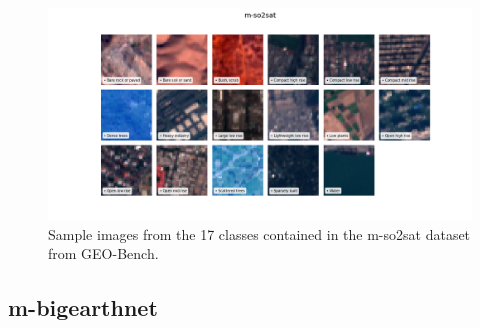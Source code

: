 \documentclass[a4paper, oneside, english]{sapthesis} %
\begin{document}
\begin{figure}[h]
    \centering
    \includegraphics[width=\textwidth]{img/m-so2sat_image_grid.png}
    \caption{\normalsize Sample images from the 17 classes contained in the m-so2sat dataset from GEO-Bench.}
    \label{fig:so2satgrid}
\end{figure}


\subsection{m-bigearthnet}
\end{document}
